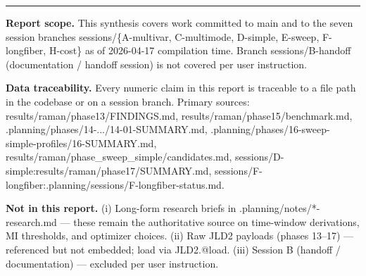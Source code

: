\documentclass[11pt,letterpaper]{article}
\def\texttt#1{#1}%
\begin{document}
\vspace{2em}
\hrule
\vspace{0.5em}
\footnotesize
\textbf{Report scope.} This synthesis covers work committed to \texttt{main} and to the seven session branches \texttt{sessions/\{A-multivar, C-multimode, D-simple, E-sweep, F-longfiber, H-cost\}} as of 2026-04-17 compilation time. Branch \texttt{sessions/B-handoff} (documentation / handoff session) is not covered per user instruction.

\textbf{Data traceability.} Every numeric claim in this report is traceable to a file path in the codebase or on a session branch. Primary sources:
\texttt{results/raman/phase13/FINDINGS.md},
\texttt{results/raman/phase15/benchmark.md},
\texttt{.planning/phases/14-.../14-01-SUMMARY.md},
\texttt{.planning/phases/16-sweep-simple-profiles/16-SUMMARY.md},
\texttt{results/raman/phase\_sweep\_simple/candidates.md},
\texttt{sessions/D-simple:results/raman/phase17/SUMMARY.md},
\texttt{sessions/F-longfiber:.planning/sessions/F-longfiber-status.md}.

\textbf{Not in this report.}
(i) Long-form research briefs in \texttt{.planning/notes/*-research.md} --- these remain the authoritative source on time-window derivations, MI thresholds, and optimizer choices.
(ii) Raw JLD2 payloads (phases 13--17) --- referenced but not embedded; load via \texttt{JLD2.@load}.
(iii) Session B (handoff / documentation) --- excluded per user instruction.
\end{document}
